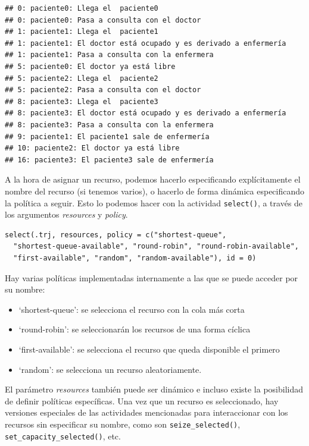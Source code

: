 \documentclass[
]{book}
\providecommand{\tightlist}{%
  \setlength{\itemsep}{0pt}\setlength{\parskip}{0pt}}
\theoremstyle{definition}
\theoremstyle{definition}
\theoremstyle{definition}
\theoremstyle{definition}
\theoremstyle{remark}
\begin{document}
\begin{verbatim}
## 0: paciente0: Llega el  paciente0
## 0: paciente0: Pasa a consulta con el doctor
## 1: paciente1: Llega el  paciente1
## 1: paciente1: El doctor está ocupado y es derivado a enfermería
## 1: paciente1: Pasa a consulta con la enfermera
## 5: paciente0: El doctor ya está libre
## 5: paciente2: Llega el  paciente2
## 5: paciente2: Pasa a consulta con el doctor
## 8: paciente3: Llega el  paciente3
## 8: paciente3: El doctor está ocupado y es derivado a enfermería
## 8: paciente3: Pasa a consulta con la enfermera
## 9: paciente1: El paciente1 sale de enfermería
## 10: paciente2: El doctor ya está libre
## 16: paciente3: El paciente3 sale de enfermería
\end{verbatim}

A la hora de asignar un recurso, podemos hacerlo especificando explícitamente el nombre del recurso (si tenemos varios), o hacerlo de forma dinámica especificando la política a seguir. Esto lo podemos hacer con la actividad \texttt{select()}, a través de los argumentos \emph{resources} y \emph{policy}.

\begin{verbatim}
select(.trj, resources, policy = c("shortest-queue",
  "shortest-queue-available", "round-robin", "round-robin-available",
  "first-available", "random", "random-available"), id = 0)
\end{verbatim}

Hay varias políticas implementadas internamente a las que se puede acceder por su nombre:

\begin{itemize}
\tightlist
\item
  `shortest-queue': se selecciona el recurso con la cola más corta
\item
  `round-robin': se seleccionarán los recursos de una forma cíclica
\item
  `first-available': se selecciona el recurso que queda disponible el primero
\item
  `random': se selecciona un recurso aleatoriamente.
\end{itemize}

El parámetro \emph{resources} también puede ser dinámico e incluso existe la posibilidad de definir políticas específicas. Una vez que un recurso es seleccionado, hay versiones especiales de las actividades mencionadas para interaccionar con los recursos sin especificar su nombre, como son \texttt{seize\_selected()}, \texttt{set\_capacity\_selected()}, etc.
\end{document}

